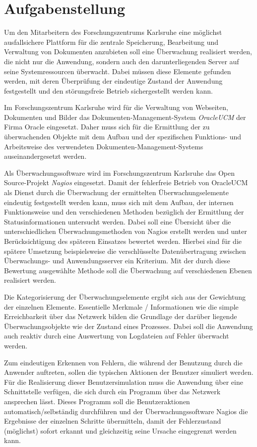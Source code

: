 \section{Aufgabenstellung}

Um den Mitarbeitern des Forschungszentrums Karlsruhe eine möglichst ausfallsichere Plattform für die zentrale Speicherung, Bearbeitung und Verwaltung von Dokumenten anzubieten soll eine Überwachung realisiert werden, die nicht nur die Anwendung, sondern auch den darunterliegenden Server auf seine Systemressourcen überwacht.
Dabei müssen diese Elemente gefunden werden, mit deren Überprüfung der eindeutige Zustand der Anwendung festgestellt und den störungsfreie Betrieb sichergestellt werden kann.

Im Forschungszentrum Karlsruhe wird für die Verwaltung von Webseiten, Dokumenten und Bilder das Dokumenten-Management-System \textit{\gls{OracleUCM}} der Firma Oracle  eingesetzt.
Daher muss sich für die Ermittlung der zu überwachenden Objekte mit dem Aufbau und der spezifischen Funktions- und Arbeitsweise des verwendeten Dokumenten-Management-Systems auseinandergesetzt werden.

Als Überwachungssoftware wird im Forschungszentrum Karlsruhe das Open Source-Projekt \textit{Nagios} eingesetzt.
Damit der fehlerfreie Betrieb von \gls{OracleUCM} als Dienst durch die Überwachung der ermittelten Überwachungselemente eindeutig festgestellt werden kann, muss sich mit dem Aufbau, der internen Funktionsweise und den verschiedenen Methoden bezüglich der Ermittlung der Statusinformationen untersucht werden.
Dabei soll eine Übersicht über die unterschiedlichen Überwachungsmethoden von Nagios erstellt werden und unter Berücksichtigung des späteren Einsatzes bewertet werden.
Hierbei sind für die spätere Umsetzung beispielsweise die verschlüsselte Datenübertragung zwischen Überwachungs- und Anwendungsserver ein Kriterium.
Mit der durch diese Bewertung ausgewählte Methode soll die Überwachung auf verschiedenen Ebenen realisiert werden.

Die Kategorisierung der Überwachungselemente ergibt sich aus der Gewichtung der einzelnen Elemente.
Essentielle Merkmale / Informationen wie die simple Erreichbarkeit über das Netzwerk bilden die Grundlage der darüber liegende Überwachungsobjekte wie der Zustand eines Prozesses.
Dabei soll die Anwendung auch reaktiv durch eine Auswertung von Logdateien auf Fehler überwacht werden.


Zum eindeutigen Erkennen von Fehlern, die während der Benutzung durch die Anwender auftreten, sollen die typischen Aktionen der Benutzer simuliert werden. 
Für die Realisierung dieser Benutzersimulation muss die Anwendung über eine Schnittstelle verfügen, die sich durch ein Programm über das Netzwerk ansprechen lässt.
Dieses Programm soll die Benutzeraktionen automatisch/selbständig durchführen und der Überwachungssoftware Nagios die Ergebnisse der einzelnen Schritte übermitteln, damit der Fehlerzustand (möglichst) sofort erkannt und gleichzeitig seine Ursache eingegrenzt werden kann.

